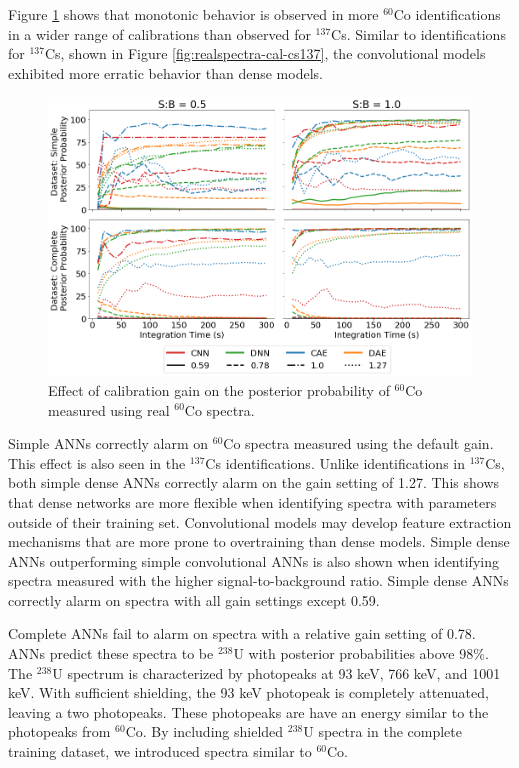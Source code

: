 Figure \ref{fig:realspectra-cal-co60} shows that monotonic behavior is observed in more $^{60}$Co identifications in a wider range of calibrations than observed for $^{137}$Cs. Similar to identifications for $^{137}$Cs, shown in Figure \ref{fig:realspectra-cal-cs137}, the convolutional models exhibited more erratic behavior than dense models.

\begin{figure}[H]
	\centering
	\includegraphics[width=1.0\linewidth]{images/realspectra-cal-co60}
		\caption{Effect of calibration gain on the posterior probability of $^{60}$Co measured using real $^{60}$Co spectra.}
	\label{fig:realspectra-cal-co60}
\end{figure}

Simple ANNs correctly alarm on $^{60}$Co spectra measured using the default gain. This effect is also seen in the $^{137}$Cs identifications. Unlike identifications in $^{137}$Cs, both simple dense ANNs correctly alarm on the gain setting of 1.27. This shows that dense networks are more flexible when identifying spectra with parameters outside of their training set. Convolutional models may develop feature extraction mechanisms that are more prone to overtraining than dense models. Simple dense ANNs outperforming simple convolutional ANNs is also shown when identifying spectra measured with the higher signal-to-background ratio. Simple dense ANNs correctly alarm on spectra with all gain settings except 0.59.

Complete ANNs fail to alarm on spectra with a relative gain setting of 0.78. ANNs predict these spectra to be $^{238}$U with posterior probabilities above 98\%. The $^{238}$U spectrum is characterized by photopeaks at 93 keV, 766 keV, and 1001 keV. With sufficient shielding, the 93 keV photopeak is completely attenuated, leaving a two photopeaks. These photopeaks are have an energy similar to the photopeaks from $^{60}$Co. By including shielded $^{238}$U spectra in the complete training dataset, we introduced spectra similar to $^{60}$Co. 


